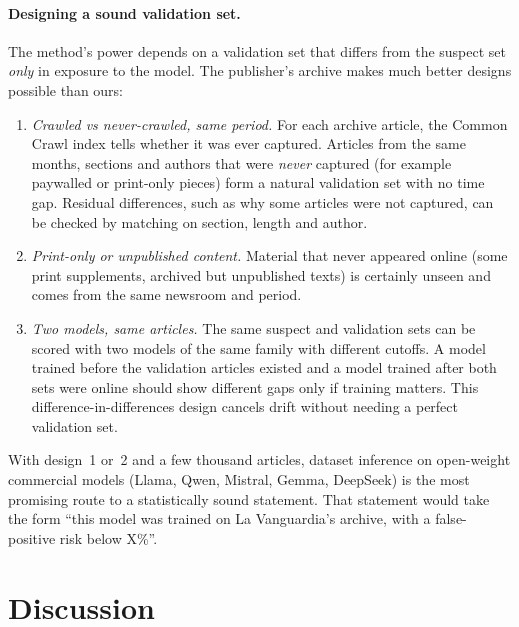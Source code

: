 \documentclass[10pt,a4paper]{article}
\begin{document}
\paragraph{Designing a sound validation set.} The method's power depends on a validation set that differs from the
suspect set \emph{only} in exposure to the model. The publisher's archive makes much better designs possible than ours:
\begin{enumerate}
\item \emph{Crawled vs never-crawled, same period.} For each archive article, the Common Crawl index tells whether it
was ever captured. Articles from the same months, sections and authors that were \emph{never} captured (for example
paywalled or print-only pieces) form a natural validation set with no time gap. Residual differences, such as why some
articles were not captured, can be checked by matching on section, length and author.
\item \emph{Print-only or unpublished content.} Material that never appeared online (some print supplements, archived
but unpublished texts) is certainly unseen and comes from the same newsroom and period.
\item \emph{Two models, same articles.} The same suspect and validation sets can be scored with two models of the
same family with different cutoffs. A model trained before the validation articles existed and a model trained after
both sets were online should show different gaps only if training matters. This difference-in-differences design
cancels drift without needing a perfect validation set.
\end{enumerate}
With design~1 or~2 and a few thousand articles, dataset inference on open-weight commercial models (Llama, Qwen,
Mistral, Gemma, DeepSeek) is the most promising route to a statistically sound statement. That statement would take
the form ``this model was trained on La Vanguardia's archive, with a false-positive risk below X\%''.

\section{Discussion}
\end{document}
